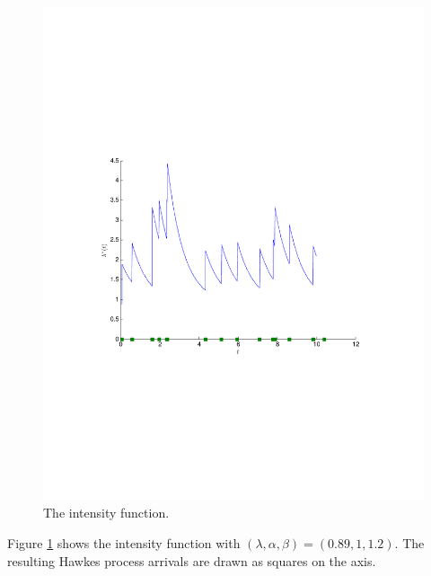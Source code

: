 \begin{figure}[H]
	\centering
	\includegraphics[trim = 0.8cm 8.5cm 0.8cm 8cm,clip,width=1.00\textwidth ]{Hawkess_ClusterIntensity.pdf}
	\caption{The intensity function.}
	\label{Example_ClusterIntensity}
\end{figure}

Figure \ref{Example_ClusterIntensity} shows the intensity function with $(\lambda, \alpha, \beta) = (0.89, 1, 1.2)$. The resulting Hawkes process arrivals are drawn as squares on the axis.